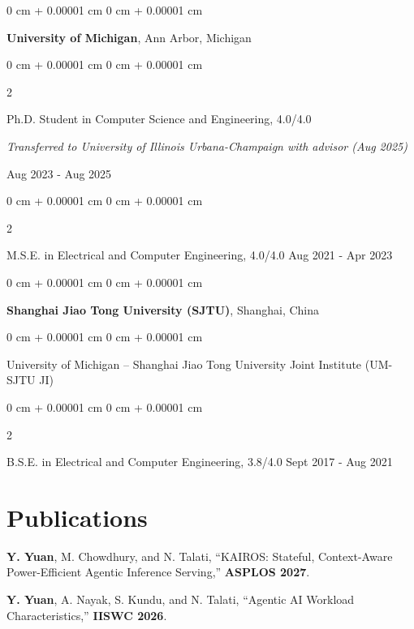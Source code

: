 \documentclass[10pt, letterpaper]{article}
\newenvironment{onecolentry}{
    \begin{adjustwidth}{
        0 cm + 0.00001 cm
    }{
        0 cm + 0.00001 cm
    }
}{
    \end{adjustwidth}
} %
\newenvironment{twocolentry}[2][]{
    \onecolentry
    \def\secondColumn{#2}
    \setcolumnwidth{\fill, 4.5 cm}
    \begin{paracol}{2}
}{
    \switchcolumn \raggedleft \secondColumn
    \end{paracol}
    \endonecolentry
} %
\begin{document}
        \begin{onecolentry}
            \textbf{University of Michigan}, Ann Arbor, Michigan
        \end{onecolentry}
        \vspace{0.10cm}
        \begin{twocolentry} {
            Aug 2023 - Aug 2025
        }
        Ph.D. Student in Computer Science and Engineering, 4.0/4.0

        \textit{Transferred to University of Illinois Urbana-Champaign with advisor (Aug 2025)}
        \end{twocolentry}
        \begin{twocolentry} {
            Aug 2021 - Apr 2023
        }
        M.S.E. in Electrical and Computer Engineering, 4.0/4.0        \end{twocolentry}

        
        \vspace{0.15cm}
        \begin{onecolentry}
            \textbf{Shanghai Jiao Tong University (SJTU)}, Shanghai, China\end{onecolentry}
        \begin{onecolentry}
            University of Michigan -- Shanghai Jiao Tong University Joint Institute (UM-SJTU JI)
        \end{onecolentry}
        \vspace{0.10cm}
        
        \begin{twocolentry}{
            Sept 2017 - Aug 2021
        }
            B.S.E. in Electrical and Computer Engineering, 3.8/4.0\end{twocolentry}
        \vspace{0.10cm}



    \section{Publications}
        \textbf{Y. Yuan}, M. Chowdhury, and N. Talati, “KAIROS: Stateful, Context-Aware Power-Efficient Agentic Inference Serving,” \textbf{ASPLOS 2027}.

        \vspace{0.25cm}
        
        \textbf{Y. Yuan}, A. Nayak, S. Kundu, and N. Talati, “Agentic AI Workload Characteristics,” \textbf{IISWC 2026}.
    
        \vspace{0.25cm}
    
\end{document}
